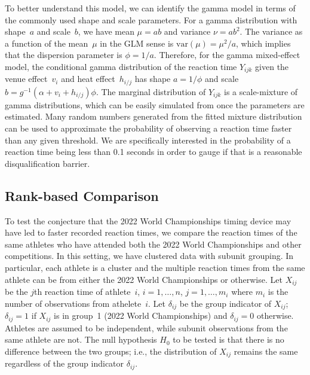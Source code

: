 \documentclass[12pt, letterpaper, titlepage]{article}
\begin{document}
To better understand this model, we can identify the gamma model in terms of the
commonly used shape and scale parameters. For a gamma distribution with
shape~$a$ and scale~$b$, we have mean $\mu = ab$ and variance $\nu = ab^2$. The
variance as a function of the mean~$\mu$ in the GLM sense is
$\text{var}(\mu) = \mu^2 / a$, which implies that the dispersion parameter is
$\phi = 1 / a$. Therefore, for the gamma mixed-effect model, the conditional
gamma distribution of the reaction time $Y_{ijk}$ given the venue
effect~$v_i$ and heat effect~$h_{i/j}$
has shape $a = 1 / \phi$ and scale
$b = g^{-1}(\alpha + v_i + h_{i/j}) \phi$. The marginal
distribution of $Y_{ijk}$ is a scale-mixture of gamma distributions, which can be
easily simulated from once the parameters are estimated. Many
random numbers generated from the fitted mixture distribution can be used to
approximate the probability of observing a reaction time faster than any given
threshold.  We are specifically interested in the probability of a reaction time
being less than 0.1 seconds in order to gauge if that is a reasonable 
disqualification barrier.


\subsection{Rank-based Comparison}\label{sec:rank}


To test the conjecture that the 2022 World Championships timing device may have 
led to faster recorded reaction times, we compare the reaction times of the same
athletes who have attended both the 2022 World Championships and other 
competitions. 
In this setting, we have clustered data with subunit grouping. In particular,
each athlete is a cluster and the multiple reaction times from the same athlete
can be from either the 2022 World Championships or otherwise.
Let $X_{ij}$ be the $j$th reaction time of athlete~$i$, $i = 1, \ldots, n$,
$j = 1, \ldots, m_i$ where $m_i$ is the number of observations from
athelete~$i$. Let $\delta_{ij}$ be the group indicator of $X_{ij}$; $\delta_{ij}
= 1$ if $X_{ij}$ is in group~1 (2022 World Championships) and $\delta_{ij} = 0$ 
otherwise. Athletes are
assumed to be independent, while subunit observations from the same athlete are
not. The null hypothesis $H_0$ to be tested is that there is no difference
between the two groups; i.e., the distribution of $X_{ij}$ remains the same
regardless of the group indicator $\delta_{ij}$.
\end{document}
